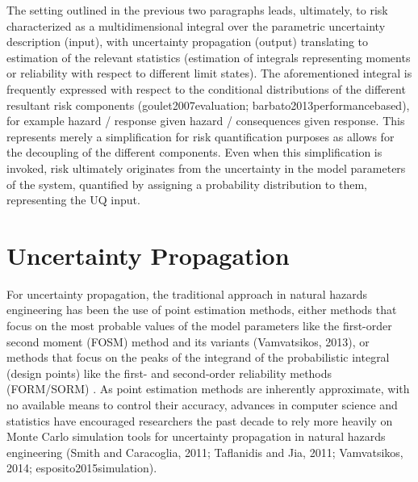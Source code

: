 The setting outlined in the previous two paragraphs leads, ultimately, to risk characterized as a multidimensional integral over the parametric uncertainty description (input), with uncertainty propagation (output) translating to estimation of the relevant statistics (estimation of integrals representing moments or reliability with respect to different limit states). The aforementioned integral is frequently expressed with respect to the conditional distributions of the different resultant risk components (goulet2007evaluation; barbato2013performancebased), for example {hazard / response given hazard / consequences given response}. This represents merely a simplification for risk quantification purposes as allows for the decoupling of the different components. Even when this simplification is invoked, risk ultimately originates from the uncertainty in the model parameters of the system, quantified by assigning a probability distribution to them, representing the UQ input. 

\section{Uncertainty Propagation}
\label{sec:uq_propagation}

For uncertainty propagation, the traditional approach in natural hazards engineering has been the use of point estimation methods, either methods that focus on the most probable values of the model parameters like the first-order second moment (FOSM) method \citep{baker2008uncertainty} and its variants (Vamvatsikos, 2013), or methods that focus on the peaks of the integrand of the probabilistic integral (design points) like the first- and second-order reliability methods (FORM/SORM) \citep{koduru2010feasibility}. As point estimation methods are inherently approximate, with no available means to control their accuracy, advances in computer science and statistics have encouraged researchers the past decade to rely more heavily on Monte Carlo simulation tools for uncertainty propagation in natural hazards engineering (Smith and Caracoglia, 2011; Taflanidis and Jia, 2011; Vamvatsikos, 2014; esposito2015simulation). 

